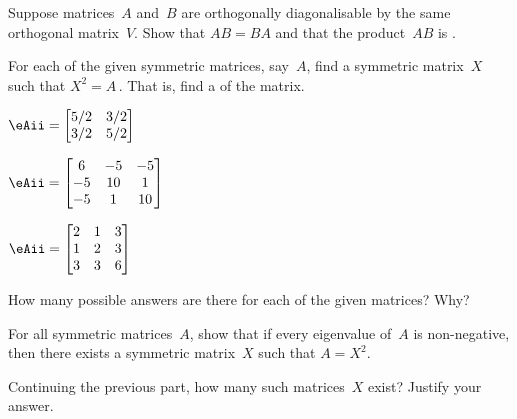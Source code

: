 \begin{exercise} \label{ex:} 
Suppose matrices~\(A\) and~\(B\) are orthogonally diagonalisable by the same orthogonal matrix~\(V\).  
Show that \(AB=BA\) and that the product~\(AB\) is .
\end{exercise}




\begin{exercise} \label{ex:} 
For each of the given symmetric matrices, say~\(A\), find a symmetric matrix~\(X\) such that \(X^2=A\)\,.  
That is, find a  of the matrix.
\begin{parts}
\item \(\eAii=\begin{bmatrix} 5/2&3/2
\\3/2&5/2 \end{bmatrix}\)

\item \(\eAii=\begin{bmatrix} 6&-5&-5
\\-5&10&1
\\-5&1&10 \end{bmatrix}\)

\item \(\eAii=\begin{bmatrix} 2&1&3
\\1&2&3
\\3&3&6 \end{bmatrix}\)

\item How many possible answers are there for each of the given matrices?  Why?

\item For all symmetric matrices~\(A\), show that if every eigenvalue of~\(A\) is non-negative, then there exists a symmetric matrix~\(X\) such that \(A=X^2\).  

\item Continuing the previous part, how many such matrices~\(X\) exist?  Justify your answer.

\end{parts}
\end{exercise}
